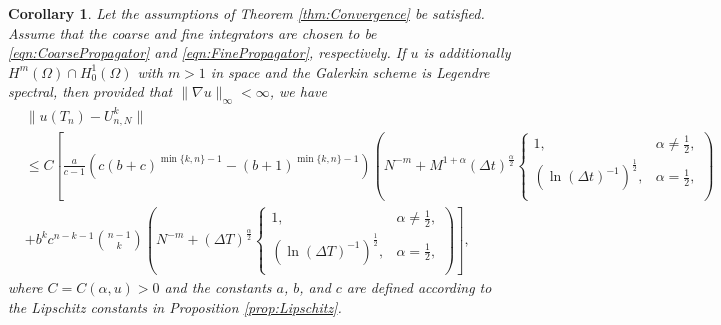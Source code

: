 \documentclass[12pt,a4paper]{article}
\newtheorem{cor}{Corollary}
\begin{document}
\begin{cor}
	Let the assumptions of Theorem \ref{thm:Convergence} be satisfied. Assume that the coarse and fine integrators are chosen to be \eqref{eqn:CoarsePropagator} and \eqref{eqn:FinePropagator}, respectively. If $u$ is additionally $H^m(\Omega) \cap H^1_0(\Omega)$ with $m > 1$ in space and the Galerkin scheme is Legendre spectral, then provided that $\|\nabla u\|_\infty < \infty$, we have
	\begin{equation}
		\begin{split}
			&\|u(T_n) - U^k_{n,N}\| \\
			&\leq C\left[\frac{a}{c-1} \left(c(b+c)^{\min\{k,n\}-1} - (b+1)^{\min\{k,n\}-1}\right)\left(N^{-m} + 
			M^{1+\alpha} (\Delta t)^{\frac{\alpha}{2}} 
			\begin{cases}
				1, & \alpha \neq \frac{1}{2}, \\
				\left(\ln (\Delta t)^{-1}\right)^{\frac{1}{2}}, & \alpha = \frac{1}{2}, \\
			\end{cases}\right) \right. \\
			&\left.+ b^k c^{n-k-1} \binom{n-1}{k} \left(N^{-m} + 
			(\Delta T)^{\frac{\alpha}{2}} 
			\begin{cases}
				1, & \alpha \neq \frac{1}{2}, \\
				\left(\ln (\Delta T)^{-1}\right)^{\frac{1}{2}}, & \alpha = \frac{1}{2}, \\
			\end{cases}\right)\right],
		\end{split}
	\end{equation}
	where $C=C(\alpha, u) > 0$ and the constants $a$, $b$, and $c$ are defined according to the Lipschitz constants in Proposition \ref{prop:Lipschitz}. 
\end{cor}
\end{document}
